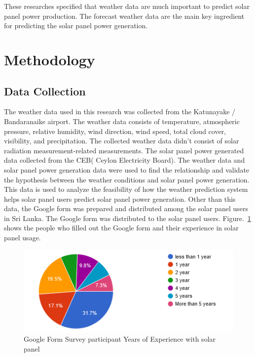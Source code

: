 \documentclass[conference]{IEEEtran}
\begin{document}
These researches specified that weather data are much important to predict solar panel power production. The forecast weather data are the main key ingredient for predicting the solar panel power generation.




\section{Methodology}
\subsection{Data Collection}
The weather data used in this research was collected from the Katunayake / Bandaranaike airport. The weather data consists of temperature, atmospheric pressure, relative humidity, wind direction, wind speed, total cloud cover, visibility, and precipitation. The collected weather data didn't consist of solar radiation measurement-related measurements. The solar panel power generated data collected from the CEB( Ceylon Electricity Board). The weather data and solar panel power generation data were used to find the relationship and validate the hypothesis between the weather conditions and solar panel power generation. This data is used to analyze the feasibility of how the weather prediction system helps solar panel users predict solar panel power generation. Other than this data, the Google form was prepared and distributed among the solar panel users in Sri Lanka. The Google form was distributed to the solar panel users. Figure.~\ref {fig:SurveyParticipants} shows the people who filled out the Google form and their experience in solar panel usage.
\begin{figure}[htp]
    \centering
    \includegraphics[width=\linewidth]{Images/Experience.png}
    \caption{Google Form Survey participant Years of Experience with solar panel}
    \label{fig:SurveyParticipants}
\end{figure}
\end{document}
